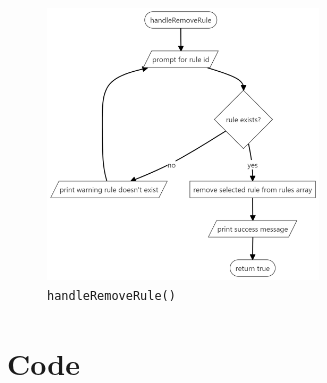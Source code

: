 \documentclass[12pt,titlepage]{article}
\begin{document}
\pagebreak

\begin{figure}[h]
    \centering
    \includegraphics[width=7.2cm]{flowcharts/handle-remove-rule.png}
    \caption{\texttt{handleRemoveRule()}}
\end{figure}

\pagebreak

\section{Code}
\end{document}
